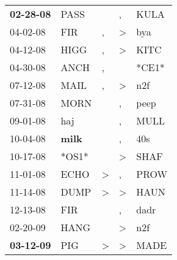 \begin{supertabular}{p{0.07\textwidth}p{0.06\textwidth}p{0.02\textwidth}p{0.02\textwidth}p{0.06\textwidth}}
 \textbf{02-28-08\textsuperscript{}} &           PASS\textsuperscript{} &                  &                , &           KULA\textsuperscript{} \\
          04-02-08\textsuperscript{} &            FIR\textsuperscript{} &                , &     \textgreater &            bya\textsuperscript{} \\
          04-12-08\textsuperscript{} &           HIGG\textsuperscript{} &                , &     \textgreater &           KITC\textsuperscript{} \\
          04-30-08\textsuperscript{} &           ANCH\textsuperscript{} &                , &                  &                            *CE1* \\
          07-12-08\textsuperscript{} &           MAIL\textsuperscript{} &                , &     \textgreater &            n2f\textsuperscript{} \\
          07-31-08\textsuperscript{} &           MORN\textsuperscript{} &                  &                , &           peep\textsuperscript{} \\
          09-01-08\textsuperscript{} &            haj\textsuperscript{} &                  &                , &           MULL\textsuperscript{} \\
          10-04-08\textsuperscript{} &  \textbf{milk\textsuperscript{}} &                  &                , &            40s\textsuperscript{} \\
          10-17-08\textsuperscript{} &                            *OS1* &                  &     \textgreater &           SHAF\textsuperscript{} \\
          11-01-08\textsuperscript{} &           ECHO\textsuperscript{} &     \textgreater &                , &           PROW\textsuperscript{} \\
          11-14-08\textsuperscript{} &           DUMP\textsuperscript{} &     \textgreater &     \textgreater &           HAUN\textsuperscript{} \\
          12-13-08\textsuperscript{} &            FIR\textsuperscript{} &                  &                , &           dadr\textsuperscript{} \\
          02-20-09\textsuperscript{} &           HANG\textsuperscript{} &                  &     \textgreater &            n2f\textsuperscript{} \\
 \textbf{03-12-09\textsuperscript{}} &            PIG\textsuperscript{} &     \textgreater &     \textgreater &           MADE\textsuperscript{} \\

\end{supertabular}
